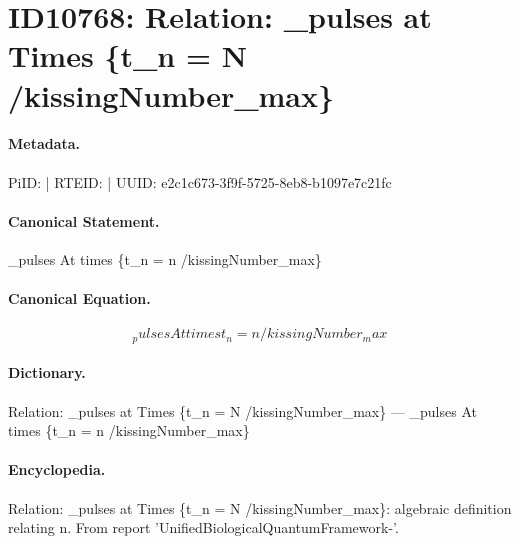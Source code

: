 \section*{ID10768: Relation: \_pulses at Times \{t\_n = N /kissingNumber\_max\}}
\paragraph{Metadata.}
PiID:  | RTEID:  | UUID: e2c1c673-3f9f-5725-8eb8-b1097e7c21fc

\paragraph{Canonical Statement.}
\_pulses At times \{t\_n = n /kissingNumber\_max\}

\paragraph{Canonical Equation.}
\[
_pulses At times {t_n = n  /kissingNumber_max}
\]

\paragraph{Dictionary.}
Relation: \_pulses at Times \{t\_n = N /kissingNumber\_max\} — \_pulses At times \{t\_n = n  /kissingNumber\_max\}

\paragraph{Encyclopedia.}
Relation: \_pulses at Times \{t\_n = N /kissingNumber\_max\}: algebraic definition relating n. From report 'UnifiedBiologicalQuantumFramework-'.
